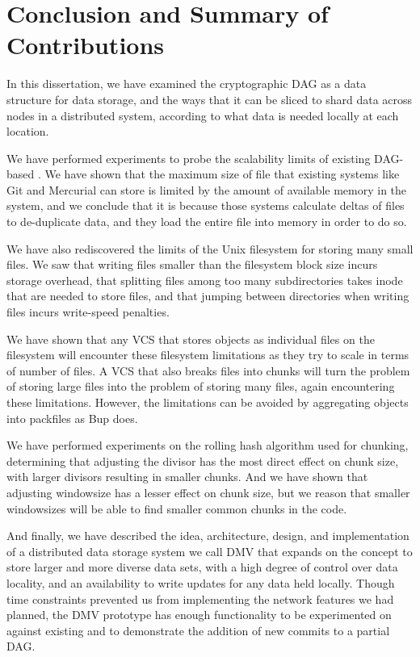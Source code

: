\chapter{Conclusion and Summary of Contributions}


In this dissertation, we have examined the cryptographic \acrfull{DAG} as a data
structure for data storage, and the ways that it can be sliced to shard data
across nodes in a distributed system, according to what data is needed locally
at each location.

We have performed experiments to probe the scalability limits of existing
\gls{DAG}-based . We have shown that the maximum size of file
that existing systems like Git and Mercurial can store is limited by the amount
of available memory in the system, and we conclude that it is because those
systems calculate deltas of files to de-duplicate data, and they load the entire
file into memory in order to do so.

We have also rediscovered the limits of the Unix filesystem for storing many
small files. We saw that writing files smaller than the filesystem block size
incurs storage overhead, that splitting files among too many subdirectories
takes \gls{inode} that are needed to store files, and that jumping between
directories when writing files incurs write-speed penalties.

We have shown that any \gls{VCS} that stores objects as individual files on the
filesystem will encounter these filesystem limitations as they try to scale in
terms of number of files. A \gls{VCS} that also breaks files into chunks will
turn the problem of storing large files into the problem of storing many files,
again encountering these limitations. However, the limitations can be avoided by
aggregating objects into \glspl{packfile} as Bup does.

We have performed experiments on the rolling hash algorithm used for chunking,
determining that adjusting the \gls{divisor} has the most direct effect on chunk
size, with larger \glspl{divisor} resulting in smaller chunks. And we have shown
that adjusting \gls{windowsize} has a lesser effect on chunk size, but we reason
that smaller \glspl{windowsize} will be able to find smaller common chunks in
the code.

And finally, we have described the idea, architecture, design, and
implementation of a distributed data storage system we call \gls{DMV} that
expands on the  concept to store
larger and more diverse data sets, with a high degree of control over data
locality, and an availability to write updates for any data held locally. Though
time constraints prevented us from implementing the network features we had
planned, the \gls{DMV} prototype has enough functionality to be experimented on
against existing  and to demonstrate the addition of new
\glspl{commit} to a partial \gls{DAG}.

